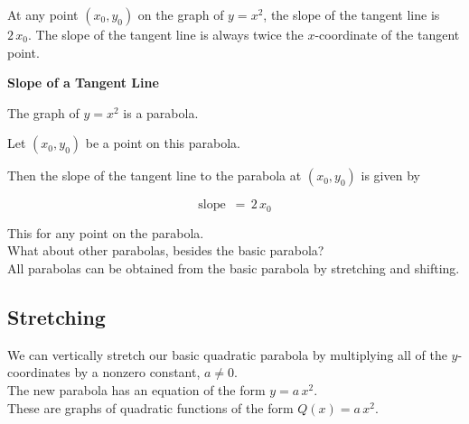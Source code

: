 \documentclass{ximera}
\begin{document}
At any point $(x_0, y_0)$ on the graph of $y = x^2$, the slope of the tangent line is $2 \, x_0$.  The slope of the tangent line is always twice the $x$-coordinate of the tangent point.




\begin{conclusion} \textbf{\textcolor{green!50!black}{Slope of a Tangent Line}} 


The graph of $y = x^2$ is a parabola.

Let $(x_0, y_0)$ be a point on this parabola.

Then the slope of the tangent line to the parabola at $(x_0, y_0)$ is given by 



\[ \text{slope } \, = \, 2 \, x_0  \]


\end{conclusion}
This for any point on the parabola. \\

What about other parabolas, besides the basic parabola? \\

All parabolas can be obtained from the basic parabola by stretching and shifting. \\



























\subsection*{Stretching}



We can vertically stretch our basic quadratic parabola by multiplying all of the $y$-coordinates by a nonzero constant, $a \ne 0$. \\


The new parabola has an equation of the form $y = a \, x^2$. \\

These are graphs of quadratic functions of the form $Q(x) = a \, x^2$. \\
\end{document}

